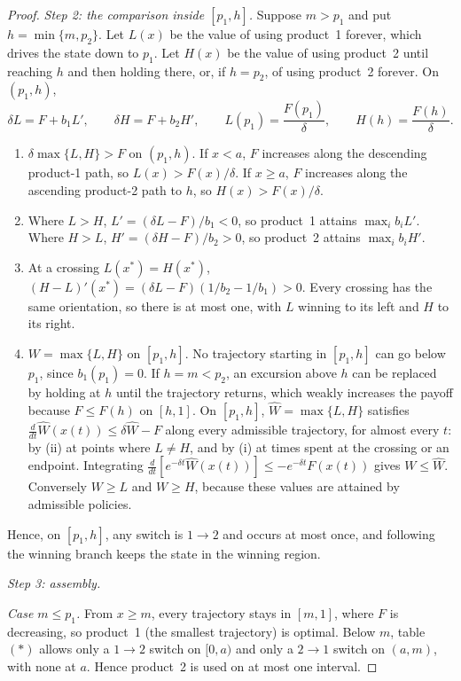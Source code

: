 \documentclass[11pt]{article}
\theoremstyle{definition}
\begin{document}
\begin{proof}
\emph{Step 2: the comparison inside $[p_1,h]$.} Suppose $m>p_1$ and put
$h=\min\{m,p_2\}$. Let $L(x)$ be the value of using product~1 forever, which
drives the state down to $p_1$. Let $H(x)$ be the value of using product~2
until reaching $h$ and then holding there, or, if $h=p_2$, of using
product~2 forever. On $(p_1,h)$,
\begin{equation*}
\delta L=F+b_1L',\qquad \delta H=F+b_2H',
\qquad L(p_1)=\frac{F(p_1)}{\delta},\qquad H(h)=\frac{F(h)}{\delta}.
\end{equation*}
\begin{enumerate}
\item[(i)] $\delta\max\{L,H\}>F$ on $(p_1,h)$. If $x<a$, $F$ increases along
the descending product-1 path, so $L(x)>F(x)/\delta$. If $x\geq a$, $F$
increases along the ascending product-2 path to $h$, so $H(x)>F(x)/\delta$.
\item[(ii)] Where $L>H$, $L'=(\delta L-F)/b_1<0$, so product~1 attains
$\max_ib_iL'$. Where $H>L$, $H'=(\delta H-F)/b_2>0$, so product~2 attains
$\max_ib_iH'$.
\item[(iii)] At a crossing $L(x^*)=H(x^*)$,
$(H-L)'(x^*)=(\delta L-F)(1/b_2-1/b_1)>0$. Every crossing has the same
orientation, so there is at most one, with $L$ winning to its left and $H$
to its right.
\item[(iv)] $W=\max\{L,H\}$ on $[p_1,h]$. No trajectory starting in
$[p_1,h]$ can go below $p_1$, since $b_1(p_1)=0$. If $h=m<p_2$, an
excursion above $h$ can be replaced by holding at $h$ until the trajectory
returns, which weakly increases the payoff because $F\leq F(h)$ on $[h,1]$.
On $[p_1,h]$, $\widehat W=\max\{L,H\}$ satisfies
$\tfrac{d}{dt}\widehat W(x(t))\leq\delta\widehat W-F$ along every admissible
trajectory, for almost every $t$: by (ii) at points where $L\neq H$, and by
(i) at times spent at the crossing or an endpoint. Integrating
$\tfrac{d}{dt}[e^{-\delta t}\widehat W(x(t))]\leq-e^{-\delta t}F(x(t))$
gives $W\leq\widehat W$. Conversely $W\geq L$ and $W\geq H$, because these
values are attained by admissible policies.
\end{enumerate}
Hence, on $[p_1,h]$, any switch is $1\to2$ and occurs at most once, and
following the winning branch keeps the state in the winning region.

\emph{Step 3: assembly.}

\emph{Case $m\leq p_1$.} From $x\geq m$, every trajectory stays in $[m,1]$,
where $F$ is decreasing, so product~1 (the smallest trajectory) is optimal.
Below $m$, table $(*)$ allows only a $1\to2$ switch on $[0,a)$ and only a
$2\to1$ switch on $(a,m)$, with none at $a$. Hence product~2 is used on at
most one interval.


\end{proof}
\end{document}
